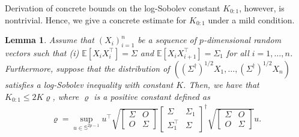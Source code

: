 \documentclass[11pt,a4paper]{article}
\newtheorem{lemma}[theorem]{Lemma}
\theoremstyle{remark}
\theoremstyle{definition}
\newcommand{\bX}{X}
\newcommand{\bu}{u}
\newcommand{\bfO}{O}
\newcommand{\bSigma}{\Sigma}
\newcommand{\bbS}{\mathbb{S}}
\newcommand{\E}{\mathbb{E}}
\theoremstyle{definition}
\begin{document}
\begin{bibunit}[apalike]
Derivation of concrete bounds on the log-Sobolev constant $K_{0:1}$, however, is nontrivial.
Hence, we give a concrete estimate for $K_{0:1}$ under a mild condition.
\begin{lemma}\label{lem:lsi:aug}
    Assume that $(\bX_{i})_{i=1}^{n}$ be a sequence of $p$-dimensional random vectors such that (i) $\E[\bX_{i}\bX_{i}^{\top}]=\bSigma$ and $\E[\bX_{i}\bX_{i+1}^{\top}]=\bSigma_{1}$ for all $i=1,\ldots,n$.
    Furthermore, suppose that the distribution of $((\bSigma^{\dagger})^{1/2}\bX_{1},\ldots,(\bSigma^{\dagger})^{1/2}\bX_{n})$ satisfies a log-Sobolev inequality with constant $K$.
    Then, we have that $K_{0:1}\le 2K\varrho$, where $\varrho$ is a positive constant defined as
    \begin{align*}
     \varrho=\sup_{\bu\in\bbS^{2p-1}}\bu^{\top}\sqrt{\left[\begin{matrix}
        \bSigma & \bfO\\
        \bfO & \bSigma
    \end{matrix}\right]}\left[\begin{matrix}
        \bSigma & \bSigma_{1}\\
        \bSigma_{1}^{\top} & \bSigma
    \end{matrix}\right]^{\dagger}
    \sqrt{\left[\begin{matrix}
        \bSigma & \bfO\\
        \bfO & \bSigma
    \end{matrix}\right]}\bu.
\end{align*}
\end{lemma}


\end{bibunit}
\end{document}
